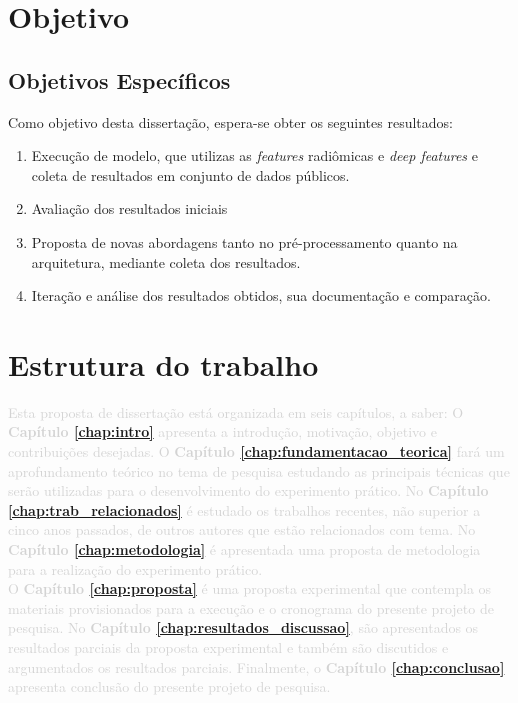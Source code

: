 \newpage

\section{Objetivo}
\label{sec:cap1_objetivo}

\subsection{Objetivos Específicos}

Como objetivo desta dissertação, espera-se obter os seguintes resultados:

\begin{enumerate}

\item Execução de modelo, que utilizas as \textit{features} radiômicas e
\textit{deep features} e coleta de resultados em conjunto de dados públicos.

\item Avaliação dos resultados iniciais

\item Proposta de novas abordagens tanto no pré-processamento quanto na arquitetura, mediante coleta dos resultados.

\item Iteração e análise dos resultados obtidos, sua documentação e comparação.
\end{enumerate}

\section{Estrutura do trabalho}
\label{sec:cap1_estrutura_trabalho}

\textcolor{lightgray}{
Esta proposta de dissertação está organizada em seis capítulos, a saber:
O \textbf{Capítulo \ref{chap:intro}} apresenta a introdução, motivação, objetivo e contribuições desejadas. O \textbf{Capítulo \ref{chap:fundamentacao_teorica}} fará um aprofundamento teórico no tema de pesquisa estudando as principais técnicas que serão utilizadas para o desenvolvimento do experimento prático. No \textbf{Capítulo \ref{chap:trab_relacionados}} é estudado  os trabalhos recentes, não superior a cinco anos passados, de outros autores que estão relacionados com tema.  No \textbf{Capítulo \ref{chap:metodologia}} é apresentada uma proposta de metodologia  para a realização do experimento prático.\\ O \textbf{Capítulo \ref{chap:proposta}} é uma proposta experimental que contempla os materiais provisionados para a execução e o cronograma do presente projeto de pesquisa. No \textbf{Capítulo \ref{chap:resultados_discussao}}, são apresentados os resultados parciais da proposta experimental e também são discutidos e argumentados os resultados parciais. Finalmente, o \textbf{Capítulo \ref{chap:conclusao}} apresenta conclusão do presente projeto de pesquisa.
}
